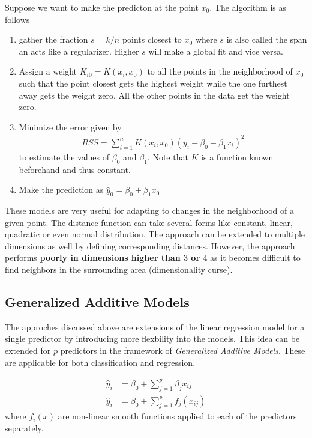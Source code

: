 \documentclass[11pt, a4paper]{article}
\begin{document}
    Suppose we want to make the predicton at the point $x_{0}$. The algorithm is as follows
    \begin{enumerate}
        \item gather the fraction $s = k/n$ points closest to $x_{0}$ where $s$ is also called the span an acts like a regularizer. Higher $s$ will make a global fit and vice versa.
        \item Assign a weight $K_{i0} = K(x_{i}, x_{0})$ to all the points in the neighborhood of $x_{0}$ such that the point closest gets the highest weight while the one furthest away gets the weight zero. All the other points in the data get the weight zero.
        \item Minimize the error given by
        \begin{align*}
            RSS = \sum_{i=1}^{n} K(x_{i}, x_{0})(y_{i} - \beta_{0} - \beta_{1}x_{i})^{2}
        \end{align*}
        to estimate the values of $\beta_{0}$ and $\beta_{1}$. Note that $K$ is a function known beforehand and thus constant.
        \item Make the prediction as $\hat{y}_{0} = \beta_{0} + \beta_{1}x_{0}$
    \end{enumerate}

    These models are very useful for adapting to changes in the neighborhood of a given point. The distance function can take several forms like constant, linear, quadratic or even normal distribution.\newline
    The approach can be extended to multiple dimensions as well by defining corresponding distances. However, the approach performs \textbf{poorly in dimensions higher than $3$ or $4$} as it becomes difficult to find neighbors in the surrounding area (dimensionality curse).

    
    \subsection{Generalized Additive Models}
    The approches discussed above are extensions of the linear regression model for a single predictor by introducing more flexbility into the models. This idea can be extended for $p$ predictors in the framework of \emph{Generalized Additive Models}. These are applicable for both classification and regression.

    \begin{align*}
        \hat{y}_{i} &= \beta_{0} + \sum_{j=1}^{p} \beta_{j} x_{ij} \tag*{Linear Rgerssion}\\
        \hat{y}_{i} &= \beta_{0} + \sum_{j=1}^{p} f_{j}(x_{ij}) \tag*{Generalized Additive Models}
    \end{align*}
    where $f_{i}(x)$ are non-linear smooth functions applied to each of the predictors separately.\newline
\end{document}

